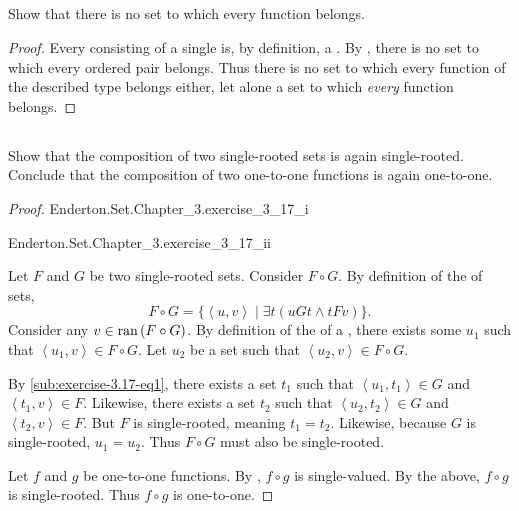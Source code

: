 \documentclass{report}
\begin{document}
\subsection{}%
\label{sub:exercise-3.16}

Show that there is no set to which every function belongs.

\begin{proof}

  Every  consisting of a single 
    is, by definition, a .
  By , there is no set to which every ordered pair
    belongs.
  Thus there is no set to which every function of the described type belongs
    either, let alone a set to which \textit{every} function belongs.

\end{proof}

\subsection{}%
\label{sub:exercise-3.17}

Show that the composition of two single-rooted sets is again single-rooted.
Conclude that the composition of two one-to-one functions is again one-to-one.

\begin{proof}

  \statementpadding

    {Enderton.Set.Chapter\_3.exercise\_3\_17\_i}

    {Enderton.Set.Chapter\_3.exercise\_3\_17\_ii}

  Let $F$ and $G$ be two single-rooted sets.
  Consider $F \circ G$.
  By definition of the  of sets,
    \begin{equation}
      \label{sub:exercise-3.17-eq1}
      F \circ G = \{\left< u, v \right> \mid \exists t(uGt \land tFv)\}.
    \end{equation}
  Consider any $v \in \mathop{\text{ran}}{(F \circ G)}$.
  By definition of the  of a , there
    exists some $u_1$ such that $\left< u_1, v \right> \in F \circ G$.
  Let $u_2$ be a set such that $\left< u_2, v \right> \in F \circ G$.

  By \eqref{sub:exercise-3.17-eq1}, there exists a set $t_1$ such that
    $\left< u_1, t_1 \right> \in G$ and $\left< t_1, v \right> \in F$.
  Likewise, there exists a set $t_2$ such that
    $\left< u_2, t_2 \right> \in G$ and $\left< t_2, v \right> \in F$.
  But $F$ is single-rooted, meaning $t_1 = t_2$.
  Likewise, because $G$ is single-rooted, $u_1 = u_2$.
  Thus $F \circ G$ must also be single-rooted.

  \suitdivider

  Let $f$ and $g$ be one-to-one functions.
  By , $f \circ g$ is single-valued.
  By the above, $f \circ g$ is single-rooted.
  Thus $f \circ g$ is one-to-one.

\end{proof}
\end{document}
